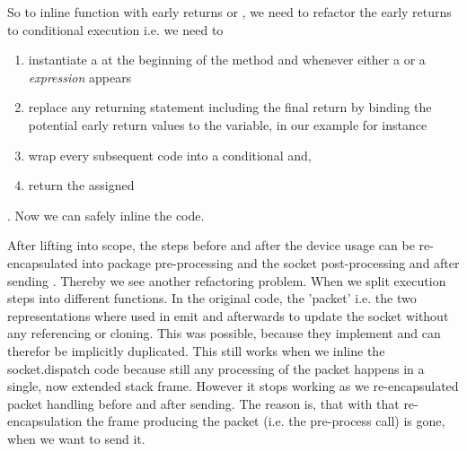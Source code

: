  So to inline function with early returns or , we need to refactor the early returns to conditional execution i.e. we need to 
 \begin{enumerate}
     \item instantiate a  at the beginning of the method and whenever either a  or a \emph{expression} appears
     \item replace any returning statement including the final return by binding the potential early return values to the  variable, in our example for instance 
     \item wrap every subsequent code into a conditional and, 
     \item return the assigned 
 \end{enumerate}
. 
Now we can safely inline the code. \\

After lifting  into scope, the steps before and after the device usage can be re-encapsulated into package pre-processing  and the socket post-processing and after sending . Thereby we see another refactoring problem. When we split execution steps into different functions. In the original code, the 'packet' i.e. the two representations where used in emit and afterwards to update the socket without any referencing or cloning. This was possible, because they implement  and can therefor be implicitly duplicated. This still works when we inline the socket.dispatch code because still any processing of the packet happens in a single, now extended stack frame. However it stops working as we re-encapsulated packet handling before and after sending. The reason is, that with that re-encapsulation the frame producing the packet (i.e. the pre-process call) is gone, when we want to send it. \\

